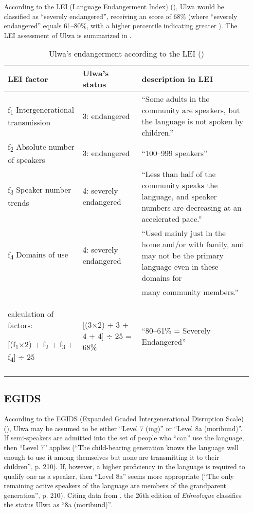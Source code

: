 According to the LEI (Language Endangerment Index) (\citealt{LeeVanWay2016,LeeVanWay2018}), Ulwa would be classified as “severely endangered”, receiving an  score of 68\% (where “severely endangered” equals 61--80\%, with a higher percentile indicating greater ). The LEI assessment of Ulwa is summarized in .


\begin{table}
\caption{Ulwa’s endangerment according to the LEI (\citealt[58--62]{LeeVanWay2018})}
\label{tab:1.13}
\begin{tabularx}{\textwidth}{QQ>{\raggedright\arraybackslash}p{.4\textwidth}}
\lsptoprule
LEI factor & Ulwa’s status & description in LEI\\
\midrule
f\textsubscript{1} Intergenerational transmission & 3: endangered & “Some adults in the community are speakers, but the language is not spoken by children.”\\
\tablevspace
f\textsubscript{2} Absolute number of speakers & 3: endangered & “100--999 speakers”\\
\tablevspace
f\textsubscript{3} Speaker number trends & 4: severely endangered & “Less than half of the community speaks the language, and speaker numbers are decreasing at an accelerated pace.”\\
\tablevspace
{f\textsubscript{4} Domains of use} & {4: severely endangered} & {“Used mainly just in the home and/or with family, and may not be the primary language even in these domains for}\\ & & {many community members.”}\\
\tablevspace
calculation of factors:

[(f\textsubscript{1}×2) + f\textsubscript{2} + f\textsubscript{3} + f\textsubscript{4}] ÷ 25 & [(3×2) + 3 + 4 + 4] ÷ 25 = 68\% & “80--61\% = Severely Endangered”\\
\lspbottomrule
\end{tabularx}
\end{table}

\newpage

\subsection{EGIDS}\label{sec:1.6.3}

According to the EGIDS (Expanded Graded Intergenerational Disruption Scale) (\citealt{LewisSimons2010}), Ulwa may be assumed to be either “Level 7 (ing)” or “Level 8a (moribund)”. If semi-speakers are admitted into the set of people who “can” use the language, then “Level 7” applies (“The child-bearing generation knows the language well enough to use it among themselves but none are transmitting it to their children”, p. 210). If, however, a higher proficiency in the language is required to qualify one as a speaker, then “Level 8a” seems more appropriate (“The only remaining active speakers of the language are members of the grandparent generation”, p. 210). Citing data from \citet{Barlow2018a}, the 26th edition of \textit{Ethnologue} \citep{EberhardEtAl2023} classifies the status Ulwa as “8a (moribund)”.

